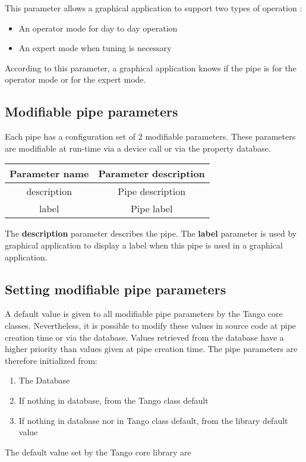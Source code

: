 \vspace{0.3cm}


This parameter allows a graphical application to support two types
of operation :
\begin{itemize}
\item An operator mode for day to day operation
\item An expert mode when tuning is necessary
\end{itemize}
According to this parameter, a graphical application knows if the
pipe is for the operator mode or for the expert mode.


\subsection{Modifiable pipe parameters}

Each pipe has a configuration set of 2 modifiable parameters. These
parameters are modifiable at run-time via a device call or via the
property database.

\vspace{0.3cm}


\begin{center}
\begin{longtable}{|c|c|}
\hline 
Parameter name & Parameter description\tabularnewline
\hline 
\hline 
description & Pipe description\tabularnewline
\hline 
label & Pipe label\tabularnewline
\hline 
\end{longtable}
\par\end{center}

\vspace{0.3cm}


The \textbf{description} parameter describes the
pipe. The \textbf{label} parameter is used by graphical
application to display a label when this pipe is used in a graphical
application.


\subsection{Setting modifiable pipe parameters}

A default value is given to all modifiable pipe parameters by the
Tango core classes. Nevertheless, it is possible to modify these values
in source code at pipe creation time or via the database. Values retrieved
from the database have a higher priority than values given at pipe
creation time. The pipe parameters are therefore initialized from:
\begin{enumerate}
\item The Database
\item If nothing in database, from the Tango class default
\item If nothing in database nor in Tango class default, from the library
default value
\end{enumerate}
The default value set by the Tango core library are

